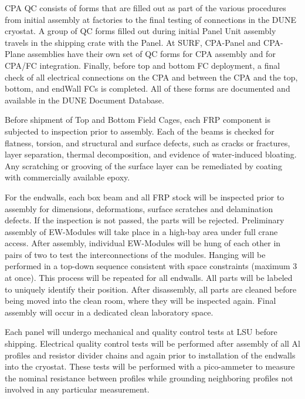 CPA QC consists of forms that are filled out as part of the various procedures from initial assembly at factories to the final testing of connections in the DUNE cryostat.  A group of QC forms filled out during initial Panel Unit assembly travels in the shipping crate with the Panel.  At SURF, CPA-Panel and CPA-Plane assemblies have their own set of QC forms for CPA assembly and for CPA/FC integration.  Finally, before top and bottom FC deployment, a final check of all electrical connections on the CPA and between the CPA and the top, bottom, and endWall FCs is completed.  All of these forms are documented and available in the DUNE Document Database.

Before shipment of Top and Bottom Field Cages, each FRP component is subjected to inspection prior to assembly. Each of the beams is checked for flatness, torsion, and structural and surface defects, such as cracks or fractures, layer separation, thermal decomposition, and evidence of water-induced bloating. Any scratching or grooving of the surface layer can be remediated by coating with commercially available epoxy.


For the endwalls, each box beam and all FRP stock will be inspected prior to assembly for dimensions, deformations, surface scratches and delamination defects. If the inspection is not passed, the parts will be rejected.
Preliminary assembly of EW-Modules will take place in a high-bay area under full crane access. After assembly, individual EW-Modules will be hung of each other in pairs of two to test the interconnections of the modules. Hanging will be performed in a top-down sequence consistent with space constraints (maximum 3 at once). This process will be repeated for all endwalls. All parts will be labeled to uniquely identify their position. After disassembly, all parts are cleaned before being moved into the clean room, where they will be inspected again. Final assembly will occur in a dedicated clean laboratory space.

Each panel will undergo mechanical and quality control tests at LSU before shipping. Electrical quality control tests will be performed after assembly of all Al profiles and resistor divider chains and again prior to installation of the endwalls into the cryostat. These tests will be performed with a pico-ammeter to measure the nominal resistance between profiles while grounding neighboring profiles not involved in any particular measurement.




